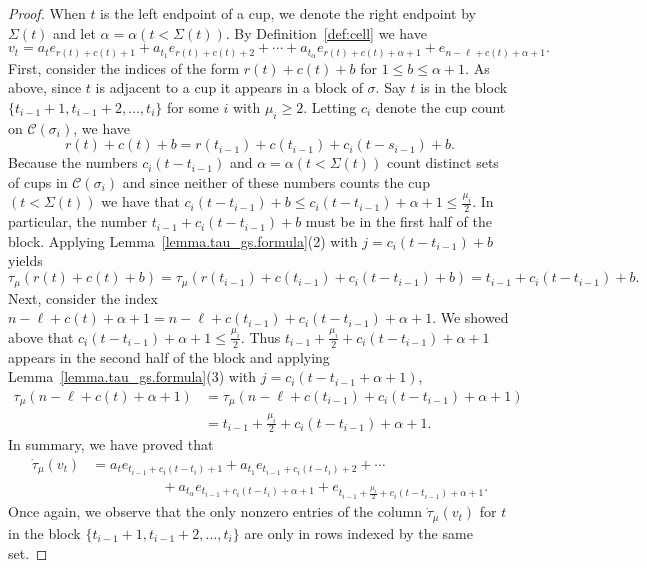 \documentclass[11pt]{amsart}
\theoremstyle{remark}
\theoremstyle{remark}
\theoremstyle{definition}
\theoremstyle{definition}
\theoremstyle{definition}
\numberwithin{equation}{section}
\newcommand{\ga}{\alpha}
\newcommand{\gs}{\sigma}
\newcommand{\cc}{\mathcal{C}}
\newcommand{\E}{\Sigma}
\newcommand{\parsum}{t}
\begin{document}
\begin{proof}
When $t$ is the left endpoint of a cup, we denote the right endpoint by $\E(t)$ and let $\ga=\ga(t<\E(t))$. By Definition~\ref{def:cell} we have 
\[
v_t = a_t e_{r(t)+c(t)+1}+a_{t_1}e_{r(t)+c(t)+2}+\cdots + a_{t_{\ga}}e_{r(t)+c(t)+\ga +1} + e_{n-\ell+c(t)+\ga+1}.
\]
First, consider the indices of the form $r(t)+c(t)+b$ for $1\leq b\leq \ga+1$. As above, since $t$ is adjacent to a cup it appears in a block of $\gs$. Say $t$ is in the block $\{\parsum_{i-1}+1, \parsum_{i-1}+2, \ldots, \parsum_i\}$ for some $i$ with $\mu_i\geq 2$. Letting $c_i$ denote the cup count on $\cc(\gs_i)$,  we have 
\[
r(t)+c(t)+b = r(\parsum_{i-1})+c(\parsum_{i-1})+c_i(t-s_{i-1}) +b.
\]
Because the numbers $c_i(t-\parsum_{i-1})$ and $\ga=\ga(t<\E(t))$ count distinct sets of cups in $\cc(\gs_i)$ and since neither of these numbers counts the cup $(t<\E(t))$ we have that $c_i(t-\parsum_{i-1}) +b \leq c_i(t-\parsum_{i-1}) + \ga+1 \leq  \frac{\mu_i}{2}$. In particular, the number $\parsum_{i-1}+c_i(t-\parsum_{i-1})+b$ must be in the first half of the block. Applying  Lemma~\ref{lemma.tau_gs.formula}(2) with $j = c_i(t-\parsum_{i-1})+b$ yields 
\[
\tau_\mu(r(t)+c(t)+b) = \tau_\mu(r(\parsum_{i-1})+c(\parsum_{i-1})+c_i(t-\parsum_{i-1})+b) = \parsum_{i-1}+c_i(t-\parsum_{i-1})+b.
\]
Next, consider the index $n-\ell+c(t)+\ga+1 = n-\ell + c(\parsum_{i-1})+c_i(t-\parsum_{i-1}) +\ga +1$. We showed above that $c_i(t-\parsum_{i-1}) +\ga +1 \leq \frac{\mu_i}{2}$. Thus $\parsum_{i-1}+\frac{\mu_i}{2}+ c_i(t-\parsum_{i-1}) +\ga +1$ appears in the second half of the block and applying  Lemma~\ref{lemma.tau_gs.formula}(3) with $j=c_i(t-\parsum_{i-1}+\ga+1)$,
\begin{align*}
\tau_\mu(n-\ell + c(t)+\ga +1) &= \tau_\mu(n-\ell + c(\parsum_{i-1})+c_i(t-\parsum_{i-1})+\ga +1)\\
&= \parsum_{i-1}+\frac{\mu_i}{2}+  c_i(t-\parsum_{i-1}) +\ga +1.
\end{align*}
In summary, we have proved that 
\begin{align*}
\dot\tau_\mu (v_t) &=  a_t e_{\parsum_{i-1}+c_i(t-\parsum_i)+1}+a_{t_1}e_{\parsum_{i-1}+c_i(t-\parsum_i)+2}+\cdots \\
& \quad \quad \quad \quad \quad + a_{t_{\ga}}e_{\parsum_{i-1}+c_i(t-\parsum_i)+\ga +1} + e_{\parsum_{i-1}+\frac{\mu_i}{2} + c_{i}(t-\parsum_{i-1}) + \ga+1}.
\end{align*}
Once again, we observe that the only nonzero entries of the column $\dot\tau_\mu (v_t)$ for $t$ in the block $\{\parsum_{i-1}+1, \parsum_{i-1}+2, \ldots, \parsum_i\}$ are only in rows indexed by the same set.


\end{proof}
\end{document}
